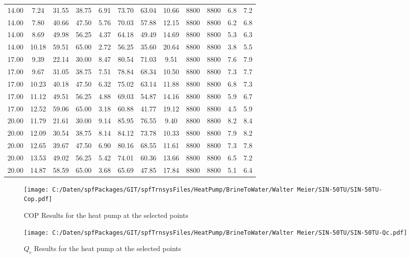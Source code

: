 \documentclass[english]{SPFShortReport}
\begin{document}
\begin{table}[!ht]
\begin{small}
\begin{center}
{\begin{tabular}{l | c c c c c c c c c c c }
14.00 & 7.24 & 31.55 & 38.75 & 6.91 & 73.70 & 63.04 & 10.66 & 8800 & 8800 & 6.8 & 7.2\\ 
14.00 & 7.80 & 40.66 & 47.50 & 5.76 & 70.03 & 57.88 & 12.15 & 8800 & 8800 & 6.2 & 6.8\\ 
14.00 & 8.69 & 49.98 & 56.25 & 4.37 & 64.18 & 49.49 & 14.69 & 8800 & 8800 & 5.3 & 6.3\\ 
14.00 & 10.18 & 59.51 & 65.00 & 2.72 & 56.25 & 35.60 & 20.64 & 8800 & 8800 & 3.8 & 5.5\\ 
17.00 & 9.39 & 22.14 & 30.00 & 8.47 & 80.54 & 71.03 & 9.51 & 8800 & 8800 & 7.6 & 7.9\\ 
17.00 & 9.67 & 31.05 & 38.75 & 7.51 & 78.84 & 68.34 & 10.50 & 8800 & 8800 & 7.3 & 7.7\\ 
17.00 & 10.23 & 40.18 & 47.50 & 6.32 & 75.02 & 63.14 & 11.88 & 8800 & 8800 & 6.8 & 7.3\\ 
17.00 & 11.12 & 49.51 & 56.25 & 4.88 & 69.03 & 54.87 & 14.16 & 8800 & 8800 & 5.9 & 6.7\\ 
17.00 & 12.52 & 59.06 & 65.00 & 3.18 & 60.88 & 41.77 & 19.12 & 8800 & 8800 & 4.5 & 5.9\\ 
20.00 & 11.79 & 21.61 & 30.00 & 9.14 & 85.95 & 76.55 & 9.40 & 8800 & 8800 & 8.2 & 8.4\\ 
20.00 & 12.09 & 30.54 & 38.75 & 8.14 & 84.12 & 73.78 & 10.33 & 8800 & 8800 & 7.9 & 8.2\\ 
20.00 & 12.65 & 39.67 & 47.50 & 6.90 & 80.16 & 68.55 & 11.61 & 8800 & 8800 & 7.3 & 7.8\\ 
20.00 & 13.53 & 49.02 & 56.25 & 5.42 & 74.01 & 60.36 & 13.66 & 8800 & 8800 & 6.5 & 7.2\\ 
20.00 & 14.87 & 58.59 & 65.00 & 3.68 & 65.69 & 47.85 & 17.84 & 8800 & 8800 & 5.1 & 6.4\\ 
\hline
\hline
\end{tabular}
}
\label{ResultsTable}
\end{center}
\end{small}
\end{table}
\begin{figure}[!ht]
\begin{center}
\texttt{[image: C:/Daten/spfPackages/GIT/spfTrnsysFiles/HeatPump/BrineToWater/Walter Meier/SIN-50TU/SIN-50TU-Cop.pdf]}
\caption{COP Results for the heat pump at the selected points}
\label{COPFig}
\end{center}
\end{figure}
\begin{figure}[!ht]
\begin{center}
\texttt{[image: C:/Daten/spfPackages/GIT/spfTrnsysFiles/HeatPump/BrineToWater/Walter Meier/SIN-50TU/SIN-50TU-Qc.pdf]}
\caption{$Q_c$ Results for the heat pump at the selected points}
\label{QcFig}
\end{center}
\end{figure}
\end{document}
